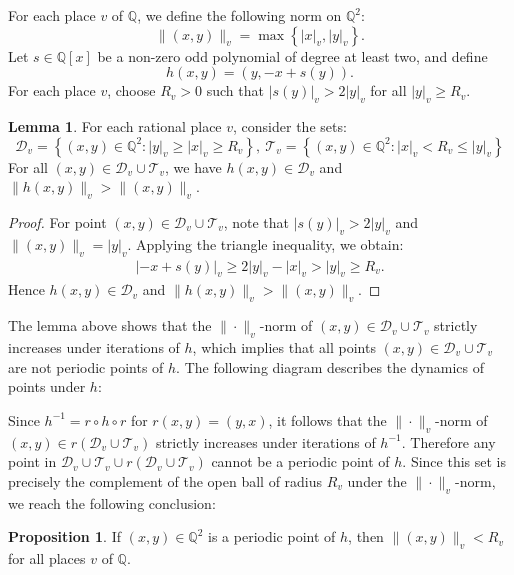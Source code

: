 \documentclass[12pt]{amsart}
\theoremstyle{definition}
\newtheorem{lemma}[theorem]{Lemma}
\newtheorem{proposition}[theorem]{Proposition}
\begin{document}
For each place $v$ of $\mathbb{Q}$, we define the following norm on $\mathbb{Q}^2$:
$$ \|(x,y)\|_{v} = 
    \max\left\{|x|_v,|y|_v\right\}. $$
Let $s\in \mathbb{Q}[x]$ be a non-zero odd polynomial of degree at least two, and define 
$$h(x,y) = (y,-x+s(y)).$$
For each place $v$, choose $R_v > 0$ such that $|s(y)|_v > 2|y|_v$ for all $|y|_v \geq R_v$. 

\begin{lemma}
    For each rational place $v$, consider the sets:
    $$ \mathcal{D}_v 
    = \left\{(x,y) \in \mathbb{Q}^2:
    |y|_v\geq |x|_v \geq  R_v \right\},\ 
    \mathcal{T}_v = \left\{(x,y)\in \mathbb{Q}^2: 
    |x|_v<R_v\leq |y|_v\right\}
    $$
    For all $(x,y)\in \mathcal{D}_v\cup \mathcal{T}_v$, we have $h(x,y)\in \mathcal{D}_v$ and $\|h(x,y)\|_{v} > \|(x,y)\|_{v}$.
\end{lemma}
\begin{proof}
    For point $(x,y)\in\mathcal{D}_v\cup \mathcal{T}_v$, note that $|s(y)|_v >2|y|_v$ and $\|(x,y)\|_v = |y|_v$. Applying the triangle inequality, we obtain:
    \begin{align*}
        |-x + s(y)|_v \geq 2|y|_v - |x|_v  > |y|_v \geq R_v.
    \end{align*}
    Hence $h(x,y)\in \mathcal{D}_v$ and $\|h(x,y)\|_v > \|(x,y)\|_v$.
\end{proof}
The lemma above shows that the $\|\cdot\|_v$-norm of $(x,y)\in\mathcal{D}_v\cup\mathcal{T}_v$ strictly increases under iterations of $h$, which implies that all points $(x,y)\in \mathcal{D}_v\cup\mathcal{T}_v$ are not periodic points of $h$. The following diagram describes the dynamics of points under $h$:
\begin{center}
\end{center}
Since $h^{-1}=r\circ h\circ r$ for $r(x,y)=(y,x)$, it follows that the $\|\cdot\|_v$-norm of $(x,y)\in r(\mathcal{D}_v\cup\mathcal{T}_v)$ strictly increases under iterations of $h^{-1}$. Therefore any point in $\mathcal{D}_v\cup\mathcal{T}_v\cup r(\mathcal{D}_v\cup\mathcal{T}_v) $ cannot be a periodic point of $h$. Since this set is precisely the complement of the open ball of radius $R_v$ under the $\|\cdot\|_v$-norm, we reach the following conclusion:
\begin{proposition}
    If $(x,y)\in \mathbb{Q}^2$ is a periodic point of $h$, then $\|(x,y)\|_v < R_v$ for all places $v$ of $\mathbb{Q}$.
\end{proposition}
\end{document}
